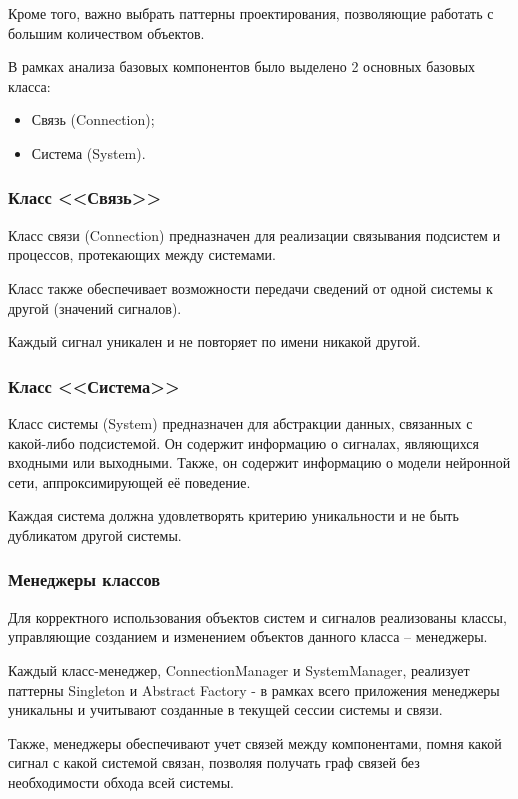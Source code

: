 Кроме того, важно выбрать паттерны проектирования, позволяющие работать с
большим количеством объектов. 

В рамках анализа базовых компонентов было выделено 2 основных базовых класса: 

\begin{itemize}
  \item Связь (Connection);
  \item Система (System). 
\end{itemize}

\subsubsection{Класс <<Связь>>}

Класс связи (Connection) предназначен для реализации связывания подсистем и
процессов, протекающих между системами. 

Класс также обеспечивает возможности передачи сведений от одной системы к другой
(значений сигналов). 

Каждый сигнал уникален и не повторяет по имени никакой другой.

\subsubsection{Класс <<Система>>}

Класс системы (System) предназначен для абстракции данных, связанных с
какой-либо подсистемой. Он содержит информацию о сигналах, являющихся входными
или выходными. Также, он содержит информацию о модели нейронной сети,
аппроксимирующей её поведение. 

Каждая система должна удовлетворять критерию уникальности и не быть дубликатом
другой системы. 

\subsubsection{Менеджеры классов}

Для корректного использования объектов систем и сигналов реализованы классы,
управляющие созданием и изменением объектов данного класса – менеджеры. 

Каждый класс-менеджер, ConnectionManager и SystemManager, реализует паттерны
Singleton и Abstract Factory - в рамках всего приложения менеджеры уникальны и
учитывают созданные в текущей сессии системы и связи. 

Также, менеджеры обеспечивают учет связей между компонентами, помня какой сигнал
с какой системой связан, позволяя получать граф связей без необходимости обхода
всей системы.

